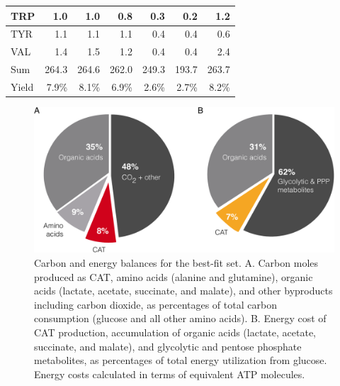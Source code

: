\documentclass[12pt]{article}
\begin{document}
\begin{table}
\begin{tabular}{lrrrrrr}
        TRP & 1.0 & 1.0 & 0.8 & 0.3 & 0.2 & 1.2 \\ \hline
        TYR & 1.1 & 1.1 & 1.1 & 0.4 & 0.4 & 0.6 \\ \hline
        VAL & 1.4 & 1.5 & 1.2 & 0.4 & 0.4 & 2.4 \\ \midrule
        Sum & 264.3 & 264.6 & 262.0 & 249.3 & 193.7 & 263.7 \\ \midrule
        Yield & 7.9\% & 8.1\% & 6.9\% & 2.6\% & 2.7\% & 8.2\% \\ \bottomrule
    \end{tabular}
\label{tbl:yield_breakdown}
\end{table}

\begin{figure}[ht]
\centering
\includegraphics[width=1.00\textwidth]{./Figures/CAT_balances.pdf}
\caption{Carbon and energy balances for the best-fit set. A. Carbon moles produced as CAT, amino acids (alanine and glutamine), organic acids (lactate, acetate, succinate, and malate), and other byproducts including carbon dioxide, as percentages of total carbon consumption (glucose and all other amino acids). B. Energy cost of CAT production, accumulation of organic acids (lactate, acetate, succinate, and malate), and glycolytic and pentose phosphate metabolites, as percentages of total energy utilization from glucose. Energy costs calculated in terms of equivalent ATP molecules.}
\label{fig:CAT_balances}
\end{figure}
\end{document}
